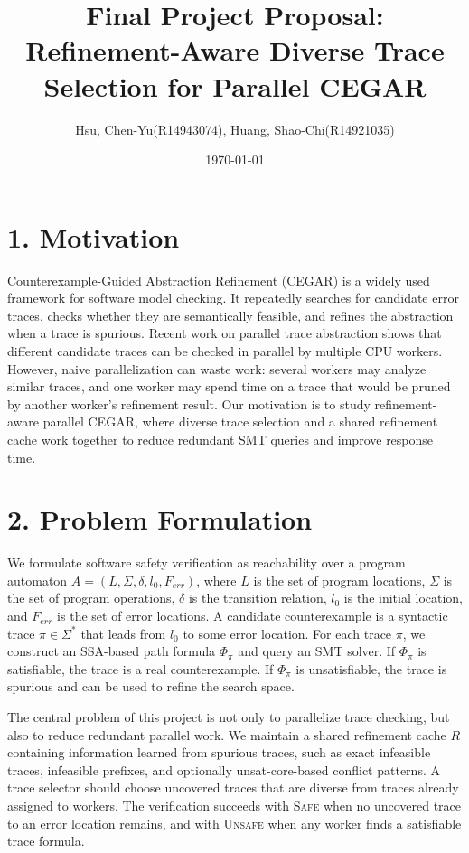 \documentclass[11pt, a4paper]{article}
\title{\textbf{Final Project Proposal: Refinement-Aware Diverse Trace Selection for Parallel CEGAR}}
\author{Hsu, Chen-Yu(R14943074), Huang, Shao-Chi(R14921035)}
\date{\today}
\begin{document}
\maketitle

\section*{1. Motivation}
Counterexample-Guided Abstraction Refinement (CEGAR) is a widely used framework for software model checking. It repeatedly searches for candidate error traces, checks whether they are semantically feasible, and refines the abstraction when a trace is spurious. Recent work on parallel trace abstraction shows that different candidate traces can be checked in parallel by multiple CPU workers. However, naive parallelization can waste work: several workers may analyze similar traces, and one worker may spend time on a trace that would be pruned by another worker's refinement result. Our motivation is to study refinement-aware parallel CEGAR, where diverse trace selection and a shared refinement cache work together to reduce redundant SMT queries and improve response time.

\section*{2. Problem Formulation}
We formulate software safety verification as reachability over a program automaton $A = (L, \Sigma, \delta, l_0, F_{err})$, where $L$ is the set of program locations, $\Sigma$ is the set of program operations, $\delta$ is the transition relation, $l_0$ is the initial location, and $F_{err}$ is the set of error locations. A candidate counterexample is a syntactic trace $\pi \in \Sigma^*$ that leads from $l_0$ to some error location. For each trace $\pi$, we construct an SSA-based path formula $\Phi_\pi$ and query an SMT solver. If $\Phi_\pi$ is satisfiable, the trace is a real counterexample. If $\Phi_\pi$ is unsatisfiable, the trace is spurious and can be used to refine the search space.

The central problem of this project is not only to parallelize trace checking, but also to reduce redundant parallel work. We maintain a shared refinement cache $R$ containing information learned from spurious traces, such as exact infeasible traces, infeasible prefixes, and optionally unsat-core-based conflict patterns. A trace selector should choose uncovered traces that are diverse from traces already assigned to workers. The verification succeeds with \textsc{Safe} when no uncovered trace to an error location remains, and with \textsc{Unsafe} when any worker finds a satisfiable trace formula.
\end{document}

